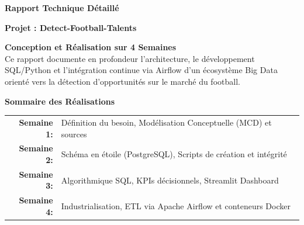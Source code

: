 \documentclass[11pt, a4paper]{article}
\begin{document}
\begin{titlepage}
    \centering
    \vspace*{1.5cm}
    
    {\Huge \textbf{\textcolor{primary}{Rapport Technique Détaillé}} \par}
    \vspace{0.5cm}
    {\LARGE \textbf{Projet : Detect-Football-Talents} \par}
    
    \vspace{1.5cm}
    
    \begin{tcolorbox}[colback=primary!5!white,colframe=primary,arc=5pt,boxrule=1.5pt]
        \centering
        \large\textbf{Conception et Réalisation sur 4 Semaines} \\
        \vspace{0.3cm}
        \normalsize Ce rapport documente en profondeur l'architecture, le développement SQL/Python et l'intégration continue via Airflow d'un écosystème Big Data orienté vers la détection d'opportunités sur le marché du football.
    \end{tcolorbox}
    
    \vspace{1.5cm}
    
    {\Large \textbf{Sommaire des Réalisations} \par}
    \vspace{0.5cm}
    \begin{tabular}{rl}
        \textbf{Semaine 1:} & Définition du besoin, Modélisation Conceptuelle (MCD) et sources \\
        \textbf{Semaine 2:} & Schéma en étoile (PostgreSQL), Scripts de création et intégrité \\
        \textbf{Semaine 3:} & Algorithmique SQL, KPIs décisionnels, Streamlit Dashboard \\
        \textbf{Semaine 4:} & Industrialisation, ETL via Apache Airflow et conteneurs Docker \\
    \end{tabular}
    
    \vfill
    

\end{titlepage}
\end{document}
